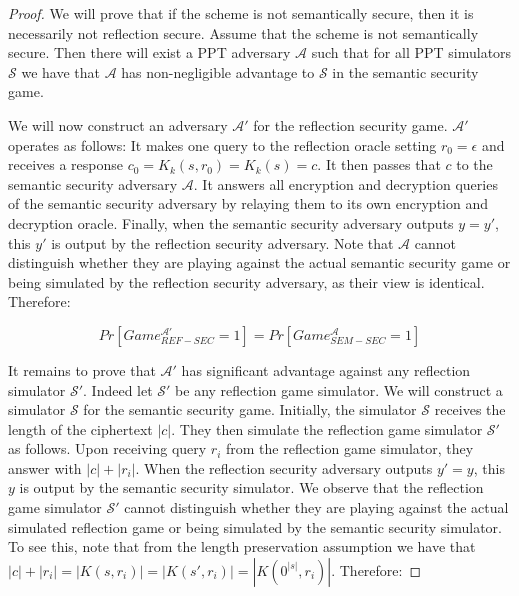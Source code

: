 \begin{proof}
    We will prove that if the scheme is not semantically secure, then it is
    necessarily not reflection secure. Assume that the scheme is not
    semantically secure. Then there will exist a PPT adversary $\mathcal{A}$
    such that for all PPT simulators $\mathcal{S}$ we have that $\mathcal{A}$
    has non-negligible advantage to $\mathcal{S}$ in the semantic security game.

    We will now construct an adversary $\mathcal{A'}$ for the reflection
    security game. $\mathcal{A'}$ operates as follows: It makes one query to
    the reflection oracle setting $r_0 = \epsilon$ and receives a response $c_0
    = K_k(s, r_0) = K_k(s) = c$. It then passes that $c$ to the semantic
    security adversary $\mathcal{A}$. It answers all encryption and decryption
    queries of the semantic security adversary by relaying them to its own
    encryption and decryption oracle. Finally, when the semantic security
    adversary outputs $y = y'$, this $y'$ is output by the reflection security
    adversary. Note that $\mathcal{A}$ cannot distinguish whether they are
    playing against the actual semantic security game or being simulated by the
    reflection security adversary, as their view is identical. Therefore:

    \begin{equation}
        Pr[Game_{REF-SEC}^{\mathcal{A'}} = 1] = Pr[Game_{SEM-SEC}^{\mathcal{A}} = 1]
    \end{equation}

    It remains to prove that $\mathcal{A'}$ has significant advantage against
    any reflection simulator $\mathcal{S'}$. Indeed let $\mathcal{S'}$ be any
    reflection game simulator. We will construct a simulator $\mathcal{S}$ for
    the semantic security game. Initially, the simulator $\mathcal{S}$ receives
    the length of the ciphertext $|c|$. They then simulate the reflection game
    simulator $\mathcal{S'}$ as follows. Upon receiving query $r_i$ from the
    reflection game simulator, they answer with $|c| + |r_i|$. When the
    reflection security adversary outputs $y' = y$, this $y$ is output by the
    semantic security simulator. We observe that the reflection game simulator
    $\mathcal{S'}$ cannot distinguish whether they are playing against the
    actual simulated reflection game or being simulated by the semantic
    security simulator. To see this, note that from the length preservation
    assumption we have that $|c| + |r_i| = |K(s, r_i)| = |K(s', r_i)| =
    |K(0^{|s|}, r_i)|$. Therefore:


\end{proof}
